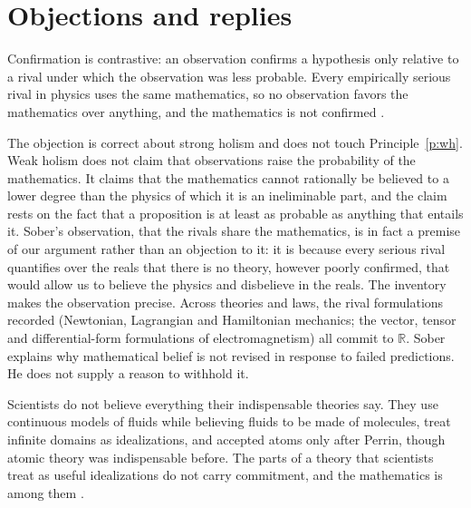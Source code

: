 \documentclass{situationist-preprint}
\begin{document}
\section{Objections and replies}\label{s:obj}

\begin{objection}\label{o:sober}
Confirmation is contrastive: an observation confirms a hypothesis only relative to a rival under which the observation was less probable. Every empirically serious rival in physics uses the same mathematics, so no observation favors the mathematics over anything, and the mathematics is not confirmed \citep{Sober1993}.
\end{objection}

\begin{reply}
The objection is correct about strong holism and does not touch Principle~\ref{p:wh}. Weak holism does not claim that observations raise the probability of the mathematics. It claims that the mathematics cannot rationally be believed to a lower degree than the physics of which it is an ineliminable part, and the claim rests on the fact that a proposition is at least as probable as anything that entails it. Sober's observation, that the rivals share the mathematics, is in fact a premise of our argument rather than an objection to it: it is because every serious rival quantifies over the reals that there is no theory, however poorly confirmed, that would allow us to believe the physics and disbelieve in the reals. The inventory makes the observation precise. Across \nTheories{} theories and \nLaws{} laws, the rival formulations recorded (Newtonian, Lagrangian and Hamiltonian mechanics; the vector, tensor and differential-form formulations of electromagnetism) all commit to $\mathbb R$. Sober explains why mathematical belief is not revised in response to failed predictions. He does not supply a reason to withhold it.
\end{reply}

\begin{objection}\label{o:maddy}
Scientists do not believe everything their indispensable theories say. They use continuous models of fluids while believing fluids to be made of molecules, treat infinite domains as idealizations, and accepted atoms only after Perrin, though atomic theory was indispensable before. The parts of a theory that scientists treat as useful idealizations do not carry commitment, and the mathematics is among them \citep{Maddy1992,Maddy1997}.
\end{objection}
\end{document}
